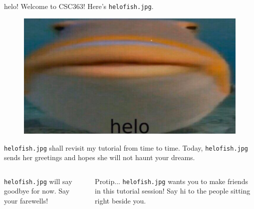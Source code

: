\documentclass{beamer}
\begin{document}
\begin{frame}{helo!}
Welcome to CSC363! Here's \texttt{helo{\textunderscore}fish.jpg}.
\begin{figure}
\includegraphics[scale=0.2]{img/helo_fish.jpg}
\end{figure}
\texttt{helo{\textunderscore}fish.jpg} shall revisit my tutorial from time to time. Today, \texttt{helo{\textunderscore}fish.jpg} sends her greetings and hopes she will not haunt your dreams. 

  \begin{columns}
    \texttt{helo{\textunderscore}fish.jpg} will say goodbye for now. Say your farewells!

      \begin{block}{Protip...}
         \texttt{helo{\textunderscore}fish.jpg} wants you to make friends in this tutorial session! Say hi to the people sitting right beside you.
      \end{block}
  \end{columns}
  
\end{frame}
\end{document}
